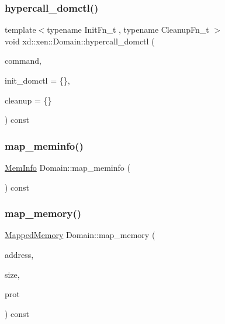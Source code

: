 \mbox{\label{classxd_1_1xen_1_1_domain_a05a0c4b4fbf0bf5f175e1fc4d32a544e}} 
\subsubsection{\texorpdfstring{hypercall\+\_\+domctl()}{hypercall\_domctl()}}
{\footnotesize\ttfamily template$<$typename Init\+Fn\+\_\+t , typename Cleanup\+Fn\+\_\+t $>$ \\
void xd\+::xen\+::\+Domain\+::hypercall\+\_\+domctl (\begin{DoxyParamCaption}\item[{uint32\+\_\+t}]{command,  }\item[{Init\+Fn\+\_\+t}]{init\+\_\+domctl = {\ttfamily \{\}},  }\item[{Cleanup\+Fn\+\_\+t}]{cleanup = {\ttfamily \{\}} }\end{DoxyParamCaption}) const\hspace{0.3cm}{\ttfamily [inline]}}

\mbox{\label{classxd_1_1xen_1_1_domain_ac0c491ad709b5145c1fc01e768eedba0}} 
\subsubsection{\texorpdfstring{map\+\_\+meminfo()}{map\_meminfo()}}
{\footnotesize\ttfamily \mbox{\hyperlink{namespacexd_1_1xen_a34ff770013f1c25915f83aac337f2334}{Mem\+Info}} Domain\+::map\+\_\+meminfo (\begin{DoxyParamCaption}{ }\end{DoxyParamCaption}) const}

\mbox{\label{classxd_1_1xen_1_1_domain_a3ea03288d59c90e019647fddfdc245f5}} 
\subsubsection{\texorpdfstring{map\+\_\+memory()}{map\_memory()}}
{\footnotesize\ttfamily \mbox{\hyperlink{namespacexd_1_1xen_ac9cd783e07e8d847ac0805eec3536746}{Mapped\+Memory}} Domain\+::map\+\_\+memory (\begin{DoxyParamCaption}\item[{\mbox{\hyperlink{namespacexd_1_1xen_a94a8d6c9448e8330c771c100dba152c3}{Address}}}]{address,  }\item[{size\+\_\+t}]{size,  }\item[{int}]{prot }\end{DoxyParamCaption}) const}

